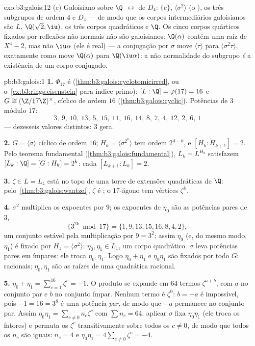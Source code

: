 \begin{solution}{exo:b3:galois:12}
(c) Galoisiano sobre $\Q$ $\leftrightarrow$  de
$D_4$: $\{e\}$, $\langle\sigma^2\rangle$ (o ), os
três subgrupos de ordem $4$ e $D_4$ --- de modo que os corpos
intermediários galoisianos são $L$, $\Q(\sqrt2, \iu)$, os três
corpos quadráticos e $\Q$. Os cinco corpos quárticos fixados por
reflexões não normais não são galoisianos: $\Q(\alpha)$ contém
uma raiz de $X^4 - 2$, mas não $\iu\alpha$ (ele é real) ---
a conjugação por $\sigma$ move $\langle\tau\rangle$ para
$\langle\sigma^2\tau\rangle$, exatamente como move
$\Q(\alpha)$ para $\Q(\iu\alpha)$: a não normalidade do
subgrupo \emph{é} a existência de um corpo conjugado.
\end{solution}

\begin{solution}{pb:b3:galois:1}
\textbf{1.} $\Phi_{17}$ é 
(\cref{thm:b3:galois:cyclotomicirred}, ou o~\cref{ex:b3:rings:eisenstein} para índice primo): $[L:\Q] =
\varphi(17) = 16$ e $G \cong (\Z/17\Z)^\times$, cíclico de
ordem $16$ (\cref{thm:b3:galois:cyclic}). Potências de $3$ módulo
$17$:
\[
3,\ 9,\ 10,\ 13,\ 5,\ 15,\ 11,\ 16,\ 14,\ 8,\ 7,\ 4,\ 12,\ 2,\
6,\ 1
\]
--- dezesseis valores distintos: $3$ gera.

\textbf{2.} $G = \langle\sigma\rangle$ cíclico de ordem $16$;
$H_k = \langle\sigma^{2^k}\rangle$ tem ordem $2^{4-k}$, e
$[H_k : H_{k+1}] = 2$. Pelo teorema fundamental
(\cref{thm:b3:galois:fundamental}), $L_k = L^{H_k}$ satisfazem
$[L_k : \Q] = [G : H_k] = 2^k$: cada $[L_{k+1}:L_k] = 2$.

\textbf{3.} $\zeta \in L = L_4$ está no topo de uma torre de extensões
quadráticas de $\Q$: pelo~\cref{thm:b3:galois:wantzel}, $\zeta$ é
\omterm{def:b3:galois:constructible}{construtível}; o $17$-ágono tem vértices $\zeta^k$.

\textbf{4.} $\sigma^2$ multiplica os expoentes por $9$; os
expoentes de $\eta_0$ são as potências pares de $3$,
\[
\{3^{2k} \bmod 17\} = \{1, 9, 13, 15, 16, 8, 4, 2\},
\]
um conjunto estável pela multiplicação por $9 = 3^2$; assim $\eta_0$
(e, do mesmo modo, $\eta_1$) é fixado por $H_1 =
\langle\sigma^2\rangle$: $\eta_0, \eta_1 \in L_1$, um corpo
quadrático. $\sigma$ leva potências pares em ímpares: ele troca $\eta_0,
\eta_1$. Logo $\eta_0 + \eta_1$ e $\eta_0\eta_1$ são fixados por
todo $G$: racionais; $\eta_0, \eta_1$ são as raízes de uma
quadrática racional.

\textbf{5.} $\eta_0 + \eta_1 = \sum_{c=1}^{16}\zeta^c = -1$. O
produto se expande em $64$ termos $\zeta^{a + b}$, com $a$ no conjunto par
e $b$ no conjunto ímpar. Nenhum termo é $\zeta^0$: $b = -a$ é
impossível, pois $-1 = 16 = 3^8$ é uma potência \emph{par}, de modo que
$-a$ permanece no conjunto par. Assim $\eta_0\eta_1 = \sum_{c \neq 0}
n_c\zeta^c$ com $\sum n_c = 64$; aplicar $\sigma$ fixa
$\eta_0\eta_1$ (ele troca os fatores) e permuta os $\zeta^c$
transitivamente sobre todos os $c \neq 0$, de modo que todos os $n_c$ são iguais: $n_c
= 4$ e $\eta_0\eta_1 = 4\sum_{c\neq0}\zeta^c = -4$.


\end{solution}
